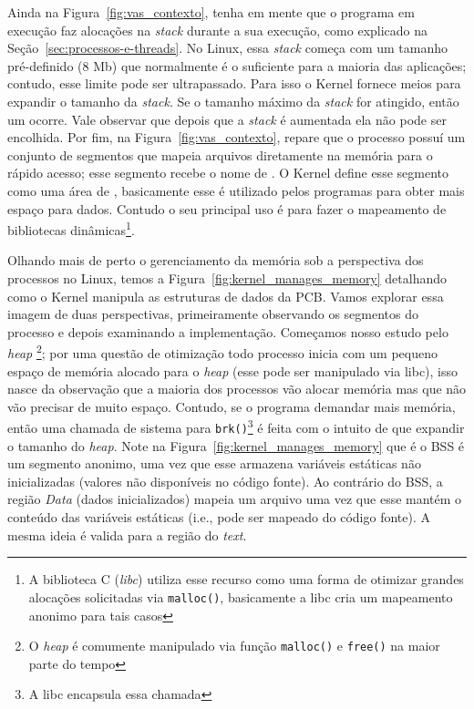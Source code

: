 Ainda na Figura~\ref{fig:vas_contexto}, tenha em mente que o programa em
execução faz alocações na \emph{stack} durante a sua execução, como explicado
na Seção~\ref{sec:processos-e-threads}. No Linux, essa \textit{stack} começa
com um tamanho pré-definido (8 Mb) que normalmente é o suficiente para a
maioria das aplicações; contudo, esse limite pode ser ultrapassado. Para isso o
Kernel fornece meios para expandir o tamanho da \emph{stack}. Se o tamanho
máximo da \textit{stack} for atingido, então um 
ocorre. Vale observar que depois que a \textit{stack} é aumentada ela não pode
ser encolhida. Por fim, na Figura~\ref{fig:vas_contexto}, repare que o processo
possuí um conjunto de segmentos que mapeia arquivos diretamente na memória para
o rápido acesso; esse segmento recebe o nome de . O Kernel define esse segmento como uma área de
, basicamente esse é utilizado pelos programas
para obter mais espaço para dados. Contudo o seu principal uso é para fazer o
mapeamento de bibliotecas dinâmicas\footnote{A biblioteca C (\textit{libc})
utiliza esse recurso como uma forma de otimizar grandes alocações solicitadas
via \texttt{malloc()}, basicamente a libc cria um mapeamento anonimo para tais
casos}.

Olhando mais de perto o gerenciamento da memória sob a perspectiva dos
processos no Linux, temos a Figura~\ref{fig:kernel_manages_memory} detalhando
como o Kernel manipula as estruturas de dados da PCB. Vamos explorar essa
imagem de duas perspectivas, primeiramente observando os segmentos do processo
e depois examinando a implementação. Começamos nosso estudo pelo \textit{heap}
\footnote{O \emph{heap} é comumente manipulado via função \texttt{malloc()} e
\texttt{free()} na maior parte do tempo}; por uma questão de otimização todo
processo inicia com um pequeno espaço de memória alocado para o \textit{heap}
(esse pode ser manipulado via libc), isso nasce da observação que a maioria dos
processos vão alocar memória mas que não vão precisar de muito espaço.
Contudo, se o programa demandar mais memória, então uma chamada de sistema para
\texttt{brk()}\footnote{A libc encapsula essa chamada} é feita com o intuito de
que expandir o tamanho do \textit{heap}. Note na
Figura~\ref{fig:kernel_manages_memory} que é o BSS é um segmento anonimo, uma
vez que esse armazena variáveis estáticas não inicializadas (valores não
disponíveis no código fonte). Ao contrário do BSS, a região \emph{Data} (dados
inicializados) mapeia um arquivo uma vez que esse mantém o conteúdo das
variáveis estáticas (i.e., pode ser mapeado do código fonte). A mesma ideia é
valida para a região do \textit{text}.


